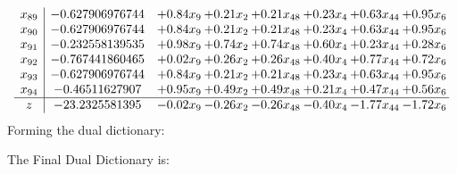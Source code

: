 \documentclass[8pt]{article}
\begin{document}
\[\begin{array}{c| c c@{\hskip 2pt} c@{\hskip 2pt} c@{\hskip 2pt} c@{\hskip 2pt} c@{\hskip 2pt} c@{\hskip 2pt} }
 x_{89}   &  -0.627906976744 & +  0.84 x_{9} & +  0.21 x_{2} & +  0.21 x_{48} & +  0.23 x_{4} & +  0.63 x_{44} & +  0.95 x_{6}\\
 x_{90}   &  -0.627906976744 & +  0.84 x_{9} & +  0.21 x_{2} & +  0.21 x_{48} & +  0.23 x_{4} & +  0.63 x_{44} & +  0.95 x_{6}\\
 x_{91}   &  -0.232558139535 & +  0.98 x_{9} & +  0.74 x_{2} & +  0.74 x_{48} & +  0.60 x_{4} & +  0.23 x_{44} & +  0.28 x_{6}\\
 x_{92}   &  -0.767441860465 & +  0.02 x_{9} & +  0.26 x_{2} & +  0.26 x_{48} & +  0.40 x_{4} & +  0.77 x_{44} & +  0.72 x_{6}\\
 x_{93}   &  -0.627906976744 & +  0.84 x_{9} & +  0.21 x_{2} & +  0.21 x_{48} & +  0.23 x_{4} & +  0.63 x_{44} & +  0.95 x_{6}\\
 x_{94}   &  -0.46511627907 & +  0.95 x_{9} & +  0.49 x_{2} & +  0.49 x_{48} & +  0.21 x_{4} & +  0.47 x_{44} & +  0.56 x_{6}\\
\hline
z    &  -23.2325581395 & -0.02 x_{9} & -0.26 x_{2} & -0.26 x_{48} & -0.40 x_{4} & -1.77 x_{44} & -1.72 x_{6}\\
\end{array}\]
Forming the dual dictionary:

The Final Dual Dictionary is: 
\end{document}
